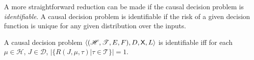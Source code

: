 A more straightforward reduction can be made if the causal decision problem is \emph{identifiable}. A causal decision problem is identifiable if the risk of a given decision function is unique for any given distribution over the inputs.

\begin{definition}[Identifiability]
A causal decision problem $\langle (\mathscr{H}, \mathscr{T}, E, F), D, \mathsf{X}, L \rangle$ is identifiable iff for each $\mu\in \mathscr{H}$, $J\in \mathscr{D}$, $|\{R(J,\mu,\tau)|\tau\in \mathscr{T}\}|=1$.
\end{definition}
